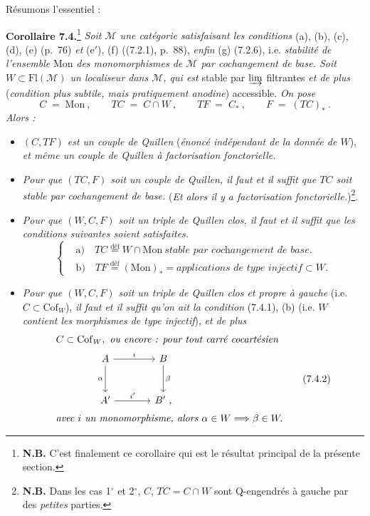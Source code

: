 \documentclass[11pt]{article}
\newcommand{\msp}[1]{\marginpar{\footnotesize [#1]}}
\newcommand{\Fl}{\mathrm{Fl}}
\newcommand{\Mon}{\mathrm{Mon}}
\newcommand{\Cof}{\mathrm{Cof}}
\begin{document}
Résumons l'essentiel :

\textbf{Corollaire 7.4.}\footnote[35]{\textbf{N.B.} C'est finalement ce corollaire qui est le résultat principal de la présente section.} \textit{Soit $\mathcal{M}$ une catégorie satisfaisant les conditions} (a), (b), (c), (d), (e) (p.~76) \textit{et} (e$'$), (f) ((7.2.1), p.~88), \textit{enfin} (g) (7.2.6), i.e. \textit{stabilité de l'ensemble} Mon \textit{des monomorphismes de $\mathcal{M}$ par cochangement de base. Soit $W\subset \Fl(\mathcal{M})$ un localiseur dans $\mathcal{M}$, qui est} stable par $\varinjlim$ filtrantes \textit{et de plus} (\textit{condition plus subtile, mais pratiquement anodine}) accessible. \textit{On pose}
\[
C \;=\; \Mon\ , \qquad TC \;=\; C\cap W\ , \qquad TF \;=\; C_*\ , \qquad F \;=\; (TC)_*\ .
\]
\textit{Alors :}
\begin{itemize}[leftmargin=*]
\item[1$^\circ$)] \textit{$(C,TF)$ est un couple de Quillen} (\textit{énoncé indépendant de la donnée de $W$}), \textit{et même un couple de Quillen à factorisation fonctorielle.}
\item[2$^\circ$)] \textit{Pour que $(TC,F)$ soit un couple de Quillen, il faut et il suffit que $TC$ soit stable par cochangement de base.} (\textit{Et alors il y a factorisation fonctorielle.})\footnote[36]{\textbf{N.B.} Dans les cas 1$^\circ$ et 2$^\circ$, $C$, $TC=C\cap W$ sont Q-engendrés à gauche par des \textit{petites} parties.}.
\item[3$^\circ$)] \textit{Pour que $(W,C,F)$ soit un triple de Quillen clos, il faut et il suffit que les conditions suivantes soient satisfaites.}
\[
\left\{
\begin{aligned}
&\text{a)}\quad TC \overset{\text{déf}}{=} W\cap \Mon\ \textit{stable par cochangement de base.}\\
&\text{b)}\quad TF \overset{\text{déf}}{=} (\Mon)_* = \textit{applications de type injectif} \subset W.
\end{aligned}
\right.
\tag*{(7.4.1)}
\]
\item[4$^\circ$)] \msp{page 99}\textit{Pour que $(W,C,F)$ soit un triple de Quillen clos et propre à gauche} (i.e. $C\subset \Cof_W$), \textit{il faut et il suffit qu'on ait la condition} (7.4.1), (b) (i.e. \textit{$W$ contient les morphismes de type injectif}), \textit{et de plus}
\[
\begin{aligned}
&C\subset \Cof_W,\ \textit{ou encore : pour tout carré cocartésien}\\
&\qquad\qquad\begin{tikzcd}[ampersand replacement=\&, row sep=large, column sep=large]
A \arrow[r, "i"] \arrow[d, "\alpha"'] \& B \arrow[d, "\beta"] \\
A' \arrow[r, "i'"] \& B'\ ,
\end{tikzcd}\\
&\textit{avec $i$ un monomorphisme, alors } \alpha\in W \Longrightarrow \beta\in W.
\end{aligned}
\tag*{(7.4.2)}
\]


\end{itemize}
\end{document}
